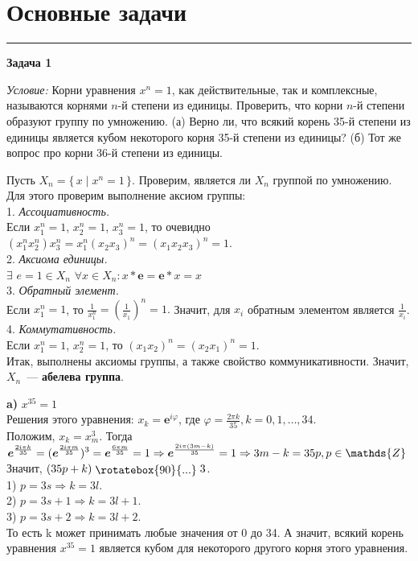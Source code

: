 \documentclass[12pt,a4paper]{article}
\newcommand{\divis}{\mathrel{\raisebox{-1pt}{\rotatebox{90}{...}}}}
\newcommand{\sbs}{\large \bfseries}
\newcommand{\rl}{\vspace{16pt} \hrule \vspace{8pt}}
\newcommand{\ve}{\boldsymbol{e}}
\begin{document}
\part*{Основные задачи}

\rl
{\sbs Задача 1}

{\itshape Условие: } Корни  уравнения  $x^n = 1$, как действительные, так и комплексные, называются корнями $n$-й степени из  единицы. Проверить, что корни $n$-й степени образуют группу по умножению. (а) Верно ли, что всякий корень 35-й степени из единицы является кубом некоторого корня 35-й степени из единицы? (б) Тот же вопрос про корни 36-й степени из единицы.

Пусть $X_n =\lbrace\, x\mid x^n = 1 \,\rbrace$. Проверим, является ли $X_n$ группой по умножению. Для этого проверим выполнение аксиом группы:
\\1. \textit{Ассоциативность. }
\\ Если $x_1^n = 1$, $x_2^n = 1$, $x_3^n = 1$, то очевидно $(x_1^n x_2^n) x_3^n=x_1^n (x_2 x_3)^n=(x_1 x_2 x_3)^n=1$.
\\2. \textit{Аксиома единицы. }
\\$\exists$ $e = 1 \in X_n$  $\forall x \in X_n: x*\ve = \ve*x=x$
\\3. \textit{Обратный элемент.}
\\Если $x_1^n=1$, то $\displaystyle \frac{1}{x_1^n}=\left( \frac{1}{x_1}\right)^n=1.$ Значит, для $x_i$ обратным элементом является $\displaystyle \frac{1}{x_i}$.
\\4. \textit{Коммутативность.}
\\ Если $x_1^n = 1$, $x_2^n = 1$, то $(x_1 x_2)^n=(x_2 x_1)^n=1.$
\\ Итак, выполнены аксиомы группы, а также свойство коммуникативности. Значит, \\$X_n$~--- \textbf{абелева группа}.

\textbf{a)} $x^ {35} = 1$
\\ Решения этого уравнения: $x_k=\ve^{i\varphi}$, где $\varphi=\frac{2\pi k}{35}, k={0, 1,\ldots, 34}$.
\\Положим, $x_k=x_m^3$. Тогда $\displaystyle \ve^{\frac{2i\pi k}{35}}=(\ve^{\frac{2i\pi m}{35}})^{3}=\ve^{\frac{6\pi m}{35}}=1 \Rightarrow \ve^{\frac{2i \pi (3m-k)}{35}}=1 \Rightarrow \\3m-k=35p,  p\in \mathds{Z}$
\\ Значит, $(35p + k) \divis 3$.
\\ 1) $p = 3s \Rightarrow k = 3l$.
\\ 2) $p = 3s + 1 \Rightarrow k = 3l +1 $.
\\ 3) $p = 3s + 2 \Rightarrow k = 3l +2 $.
\\ То есть k может принимать любые значения от 0 до 34. А значит, всякий корень уравнения  $x^ {35} = 1$ является кубом для некоторого другого корня этого уравнения.
\end{document}
